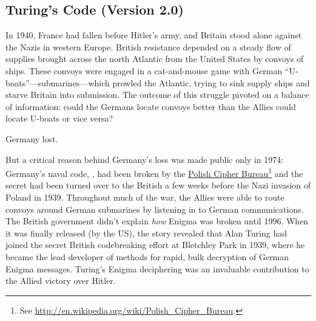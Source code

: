 \subsection{Turing's Code (Version 2.0)}

In 1940, France had fallen before Hitler's army, and Britain stood alone
against the Nazis in western Europe.  British resistance depended on a
steady flow of supplies brought across the north Atlantic from the United
States by convoys of ships.  These convoys were engaged in a cat-and-mouse
game with German ``U-boats''---submarines---which prowled the Atlantic,
trying to sink supply ships and starve Britain into submission.  The
outcome of this struggle pivoted on a balance of information: could the
Germans locate convoys better than the Allies could locate U-boats or vice
versa?

Germany lost.

But a critical reason behind Germany's loss was made public only in
1974: Germany's naval code, , had been broken by the
\href{http://en.wikipedia.org/wiki/Polish_Cipher_Bureau}{Polish Cipher
  Bureau}\footnote{See
  \url{http://en.wikipedia.org/wiki/Polish\_Cipher\_Bureau}.} and the
secret had been turned over to the British a few weeks before the Nazi
invasion of Poland in 1939.  Throughout much of the war, the Allies
were able to route convoys around German submarines by listening in to
German communications.  The British government didn't explain
\emph{how} Enigma was broken until 1996.  When it was finally released
(by the US), the story revealed that Alan Turing had joined the secret
British codebreaking effort at Bletchley Park in 1939, where he became
the lead developer of methods for rapid, bulk decryption of German
Enigma messages.  Turing's Enigma deciphering was an invaluable
contribution to the Allied victory over Hitler.


